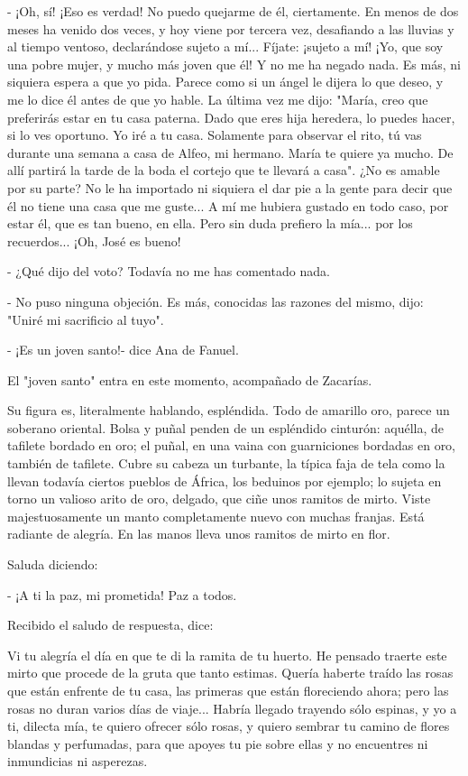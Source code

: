 \documentclass[12pt]{book} %
\begin{document}
- ¡Oh, sí! ¡Eso es verdad! No puedo quejarme de él, ciertamente. En menos de dos meses ha venido dos veces, y hoy viene por tercera vez, desafiando a las lluvias y al tiempo ventoso, declarándose sujeto a mí... Fíjate: ¡sujeto a mí! ¡Yo, que soy una pobre mujer, y mucho más joven que él! Y no me ha negado nada. Es más, ni siquiera espera a que yo pida. Parece como si un ángel le dijera lo que deseo, y me lo dice él antes de que yo hable. La última vez me dijo: "María, creo que preferirás estar en tu casa paterna. Dado que eres hija heredera, lo puedes hacer, si lo ves oportuno. Yo iré a tu casa. Solamente para observar el rito, tú vas durante una semana a casa de Alfeo, mi hermano. María te quiere ya mucho. De allí partirá la tarde de la boda el cortejo que te llevará a casa". ¿No es amable por su parte? No le ha importado ni siquiera el dar pie a la gente para decir que él no tiene una casa que me guste... A mí me hubiera gustado en todo caso, por estar él, que es tan bueno, en ella. Pero sin duda prefiero la mía... por los recuerdos... ¡Oh, José es bueno! 

- ¿Qué dijo del voto? Todavía no me has comentado nada. 

- No puso ninguna objeción. Es más, conocidas las razones del mismo, dijo: "Uniré mi sacrificio al tuyo". 

- ¡Es un joven santo!- dice Ana de Fanuel. 

El "joven santo" entra en este momento, acompañado de Zacarías. 

Su figura es, literalmente hablando, espléndida. Todo de amarillo oro, parece un soberano oriental. Bolsa y puñal penden de un espléndido cinturón: aquélla, de tafilete bordado en oro; el puñal, en una vaina con guarniciones bordadas en oro, también de tafilete. Cubre su cabeza un turbante, la típica faja de tela como la llevan todavía ciertos pueblos de África, los beduinos por ejemplo; lo sujeta en torno un valioso arito de oro, delgado, que ciñe unos ramitos de mirto. Viste majestuosamente un manto completamente nuevo con muchas franjas. Está radiante de alegría. En las manos lleva unos ramitos de mirto en flor. 

Saluda diciendo: 

- ¡A ti la paz, mi prometida! Paz a todos. 

Recibido el saludo de respuesta, dice: 

Vi tu alegría el día en que te di la ramita de tu huerto. He pensado traerte este mirto que procede de la gruta que tanto estimas. Quería haberte traído las rosas que están enfrente de tu casa, las primeras que están floreciendo ahora; pero las rosas no duran varios días de viaje... Habría llegado trayendo sólo espinas, y yo a ti, dilecta mía, te quiero ofrecer sólo rosas, y quiero sembrar tu camino de flores blandas y perfumadas, para que apoyes tu pie sobre ellas y no encuentres ni inmundicias ni asperezas. 
\end{document}
